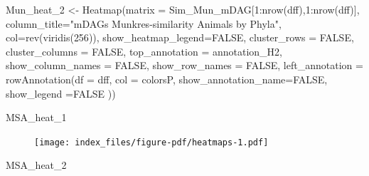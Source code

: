 \documentclass[
  letterpaper,
  DIV=11,
  numbers=noendperiod]{scrreprt}
\newenvironment{Shaded}{}{}
\newcommand{\AttributeTok}[1]{\textcolor[rgb]{0.78,0.47,0.87}{#1}}
\newcommand{\ConstantTok}[1]{\textcolor[rgb]{0.82,0.60,0.40}{#1}}
\newcommand{\DecValTok}[1]{\textcolor[rgb]{0.82,0.60,0.40}{#1}}
\newcommand{\FunctionTok}[1]{\textcolor[rgb]{0.38,0.69,0.94}{#1}}
\newcommand{\NormalTok}[1]{\textcolor[rgb]{0.67,0.70,0.75}{#1}}
\newcommand{\OtherTok}[1]{\textcolor[rgb]{0.15,0.68,0.38}{#1}}
\newcommand{\SpecialCharTok}[1]{\textcolor[rgb]{0.34,0.71,0.76}{#1}}
\newcommand{\StringTok}[1]{\textcolor[rgb]{0.60,0.76,0.47}{#1}}
\begin{document}
\begin{Shaded}
\begin{Highlighting}[]
\NormalTok{Mun\_heat\_2 }\OtherTok{\textless{}{-}} \FunctionTok{Heatmap}\NormalTok{(}\AttributeTok{matrix =}\NormalTok{ Sim\_Mun\_mDAG[}\DecValTok{1}\SpecialCharTok{:}\FunctionTok{nrow}\NormalTok{(dff),}\DecValTok{1}\SpecialCharTok{:}\FunctionTok{nrow}\NormalTok{(dff)], }
              \AttributeTok{column\_title=}\StringTok{"mDAGs Munkres{-}similarity  Animals by Phyla"}\NormalTok{,}
        \AttributeTok{col=}\FunctionTok{rev}\NormalTok{(}\FunctionTok{viridis}\NormalTok{(}\DecValTok{256}\NormalTok{)),}
    \AttributeTok{show\_heatmap\_legend=}\ConstantTok{FALSE}\NormalTok{, }
        \AttributeTok{cluster\_rows =} \ConstantTok{FALSE}\NormalTok{,}
        \AttributeTok{cluster\_columns =} \ConstantTok{FALSE}\NormalTok{,}
        \AttributeTok{top\_annotation =}\NormalTok{ annotation\_H2,}
        \AttributeTok{show\_column\_names =} \ConstantTok{FALSE}\NormalTok{, }
        \AttributeTok{show\_row\_names =} \ConstantTok{FALSE}\NormalTok{,}
        \AttributeTok{left\_annotation =} \FunctionTok{rowAnnotation}\NormalTok{(}\AttributeTok{df =}\NormalTok{ dff,}
                                        \AttributeTok{col =}\NormalTok{ colorsP,}
                                    \AttributeTok{show\_annotation\_name=}\ConstantTok{FALSE}\NormalTok{,}
                                        \AttributeTok{show\_legend =}\ConstantTok{FALSE}
\NormalTok{                                        ))}
\end{Highlighting}
\end{Shaded}

\begin{Shaded}
\begin{Highlighting}[]
\NormalTok{MSA\_heat\_1}
\end{Highlighting}
\end{Shaded}

\begin{figure}[H]

{\centering \texttt{[image: index\_files/figure-pdf/heatmaps-1.pdf]}

}

\end{figure}

\begin{Shaded}
\begin{Highlighting}[]
\NormalTok{MSA\_heat\_2}
\end{Highlighting}
\end{Shaded}
\end{document}
